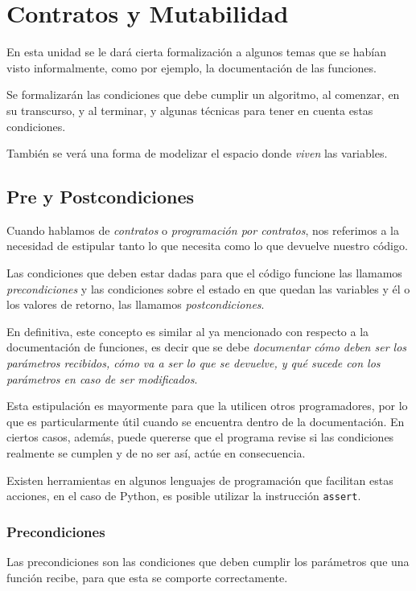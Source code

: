 \chapter{Contratos y Mutabilidad}

En esta unidad se le dará cierta formalización a algunos temas que se habían
visto informalmente, como por ejemplo, la documentación de las funciones.

Se formalizarán las condiciones que debe cumplir un algoritmo, al comenzar, en
su transcurso, y al terminar, y algunas técnicas para tener en cuenta estas
condiciones.

También se verá una forma de modelizar el espacio donde \textit{viven} las
variables.

\section{Pre y Postcondiciones}

Cuando hablamos de \textit{contratos} o \textit{programación por
contratos}, nos referimos a la necesidad de estipular tanto lo que necesita
como lo que devuelve nuestro código.

Las condiciones que deben estar dadas para que el código funcione las llamamos
\emph{precondiciones} y las condiciones sobre el estado en que quedan las
variables y él o los valores de retorno, las llamamos \emph{postcondiciones}.

En definitiva, este concepto es similar al ya mencionado con respecto a la
documentación de funciones, es decir que se debe \emph{documentar cómo deben
ser los parámetros recibidos, cómo va a ser lo que se devuelve, y qué
sucede con los parámetros en caso de ser modificados}.

Esta estipulación es mayormente para que la utilicen otros programadores,
por lo que es particularmente útil cuando se encuentra dentro de la
documentación. En ciertos casos, además, puede quererse que el programa
revise si las condiciones realmente se cumplen y de no ser así, actúe en
consecuencia.

Existen herramientas en algunos lenguajes de programación que facilitan estas
acciones, en el caso de Python, es posible utilizar la instrucción
\lstinline!assert!.

\subsection{Precondiciones}

Las precondiciones son las condiciones que deben cumplir los parámetros que
una función recibe, para que esta se comporte correctamente.


